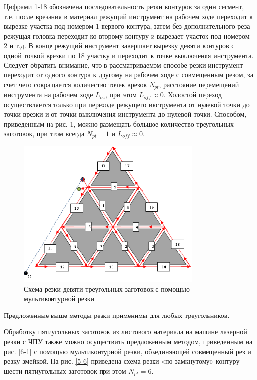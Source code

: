 \documentclass{article}
\begin{document}
Цифрами 1-18 обозначена последовательность
резки контуров за один сегмент,
т.е. после врезания в материал режущий инструмент
на рабочем ходе переходит к вырезке участка
под номером 1 первого контура,
затем без дополнительного реза режущая
головка переходит ко второму контуру и
вырезает участок под номером 2 и т.д.
В конце режущий инструмент завершает
вырезку девяти контуров с одной точкой врезки
по 18 участку и переходит к точке выключения инструмента.
Следует обратить внимание, что в рассматриваемом способе
резки инструмент переходит от одного контура к
другому на рабочем ходе с совмещенным резом,
за счет чего сокращается количество точек врезок $N_{pt}$,
расстояние перемещений инструмента на рабочем ходе  $L_{on}$,
при этом
$L_{off} \approx 0$.
Холостой переход осуществляется
только при переходе режущего инструмента
от нулевой точки до точки врезки и от
точки выключения инструмента до нулевой точки.
Способом, приведенным на рис. \ref{3-10},
можно размещать большое количество
треугольных заготовок, при этом всегда $N_{pt}=1$
и $L_{off} \approx 0$.

\begin{figure}
  \begin{center}
  \includegraphics[width=0.8\textwidth]{3-10.png}
  \caption{Схема резки девяти треугольных заготовок с помощью мультиконтурной резки}
  \label{3-10}
  \end{center}
\end{figure}

Предложенные выше методы резки  применимы для любых треугольников.

Обработку пятиугольных заготовок из листового материала
на машине лазерной резки с ЧПУ также можно осуществить
предложенным методом, приведенным на рис. \ref{6-1}
с помощью мультиконтурной резки,
объединяющей совмещенный рез и резку змейкой.
На рис. \ref{5-6}
приведена схема резки «по замкнутому» контуру
шести пятиугольных заготовок при этом $N_{pt}=6$.
\end{document}
